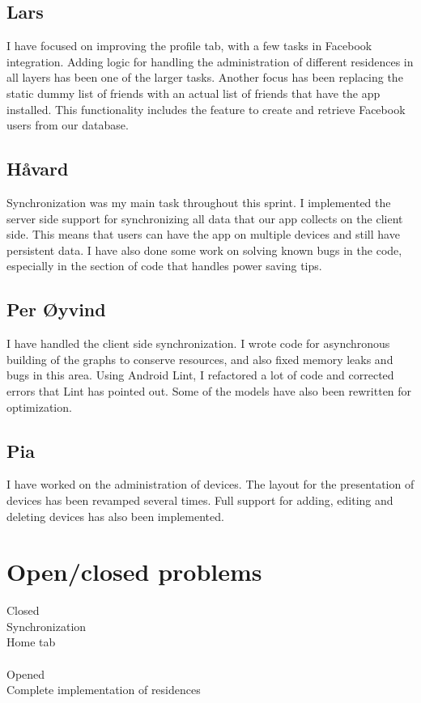 \documentclass[12pt]{article}
\begin{document}
\subsection*{Lars}
I have focused on improving the profile tab, with a few tasks in Facebook integration. Adding logic for handling the administration of different residences in all layers has been one of the larger tasks. Another focus has been replacing the static dummy list of friends with an actual list of friends that have the app installed. This functionality includes the feature to create and retrieve Facebook users from our database.

\subsection*{Håvard}
Synchronization was my main task throughout this sprint. I implemented the server side support for synchronizing all data that our app collects on the client side. This means that users can have the app on multiple devices and still have persistent data. I have also done some work on solving known bugs in the code, especially in the section of code that handles power saving tips.


\subsection*{Per Øyvind}
I have handled the client side synchronization. I wrote code for asynchronous building of the graphs to conserve resources, and also fixed memory leaks and bugs in this area. Using Android Lint, I refactored a lot of code and corrected errors that Lint has pointed out. Some of the models have also been rewritten for optimization.

\subsection*{Pia}
I have worked on the administration of devices. The layout for the presentation of devices has been revamped several times. Full support for adding, editing and deleting devices has also been implemented.

\section{Open/closed problems}
Closed \\
Synchronization\\
Home tab\\\\
Opened \\
Complete implementation of residences
\end{document}

